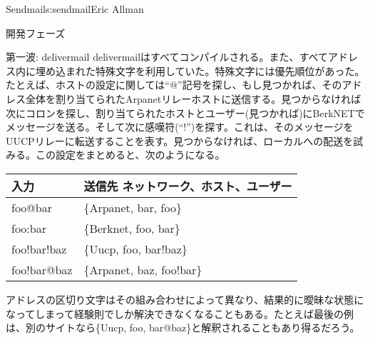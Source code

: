 \begin{aosachapter}{Sendmail}{s:sendmail}{Eric Allman}
\begin{aosasect1}{開発フェーズ}
\begin{aosasect2}{第一波: delivermail}
delivermailはすべてコンパイルされる。また、すべてアドレス内に埋め込まれた特殊文字を利用していた。特殊文字には優先順位があった。たとえば、ホストの設定に関しては``@''記号を探し、もし見つかれば、そのアドレス全体を割り当てられたArpanetリレーホストに送信する。見つからなければ次にコロンを探し、割り当てられたホストとユーザー(見つかれば)にBerkNETでメッセージを送る。そして次に感嘆符(``!'')を探す。これは、そのメッセージをUUCPリレーに転送することを表す。見つからなければ、ローカルへの配送を試みる。この設定をまとめると、次のようになる。

\begin{table}[h!]\centering
\begin{tabular}{|ll|}
\hline
入力 & 送信先 {ネットワーク、ホスト、ユーザー} \\
\hline
foo@bar & \{Arpanet, bar, foo\} \\
foo:bar & \{Berknet, foo, bar\} \\
foo!bar!baz & \{Uucp, foo, bar!baz\} \\
foo!bar@baz & \{Arpanet, baz, foo!bar\} \\
\hline
\end{tabular}
\end{table}

\noindent
アドレスの区切り文字はその組み合わせによって異なり、結果的に曖昧な状態になってしまって経験則でしか解決できなくなることもある。たとえば最後の例は、別のサイトなら\{Uucp, foo, bar@baz\}と解釈されることもあり得るだろう。


\end{aosasect2}
\end{aosasect1}
\end{aosachapter}
